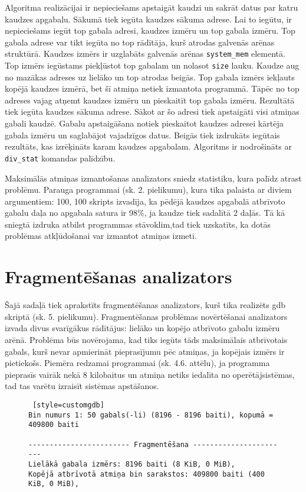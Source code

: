 Algoritma realizācijai ir nepieciešams apstaigāt kaudzi un sakrāt datus par katru kaudzes apgabalu.
Sākumā tiek iegūta kaudzes sākuma adrese.
Lai to iegūtu, ir nepieciešams iegūt top gabala adresi, kaudzes izmēru un top gabala izmēru.
Top gabala adrese var tikt iegūta no top rādītāja, kurš atrodas galvenās arēnas struktūrā.
Kaudzes izmērs ir uzglabāts galvenās arēnas \texttt{system\_mem} elementā.
Top izmērs iegūstams piekļūstot top gabalam un nolasot \texttt{size} lauku.
Kaudze aug no mazākas adreses uz lielāko un top atrodas beigās.
Top gabala izmērs iekļauts kopējā kaudzes izmērā, bet šī atmiņa netiek izmantota programmā.
Tāpēc no top adreses vajag atņemt kaudzes izmēru un pieskaitīt top gabala izmēru.
Rezultātā tiek iegūta kaudzes sākuma adrese.
Sākot ar šo adresi tiek apstaigāti visi atmiņas gabali kaudzē.
Gabalu apstaigāšana notiek pieskaitot kaudzes adresei kārtēja gabala izmēru un saglabājot vajadzīgos datus.
Beigās tiek izdrukāts iegūtais rezultāts, kas izrēķināts karam kaudzes apgabalam.
Algoritms ir nodrošināts ar \texttt{div\_stat} komandas palīdzību.

Maksimālās atmiņas izmantošanas analizators sniedz statistiku, kura palīdz atrast problēmu.
Parauga programmai (sk. 2. pielikumu), kura tika palaista ar diviem argumentiem: 100, 100 skripts izvadīja, ka pēdējā kaudzes apgabalā atbrīvoto gabalu daļa no apgabala satura ir 98\%, ja kaudze tiek sadalītā 2 daļās.
Tā kā sniegtā izdruka atbilst programmas stāvoklim,tad tiek uzskatīts, ka dotās problēmas atkļūdošanai var izmantot atmiņas izmeti.

\section{Fragmentēšanas analizators}
Šajā sadaļā tiek aprakstīts fragmentēšanas analizators, kurš tika realizēts gdb skriptā (sk. 5. pielikumu).
Fragmentēšanas problēmas novērtēšanai analizators izvada divus svarīgākus rādītājus: lielāko un kopējo atbrīvoto gabalu izmēru arēnā.
Problēma būs novērojama, kad tiks iegūts tāds maksimālais atbrīvotais gabals, kurš nevar apmierināt pieprasījumu pēc atmiņas, ja kopējais izmērs ir pietiekošs.
Piemēra redzamai programmai (sk. 4.6. attēlu), ja programma pieprasīs vairāk nekā 8 kilobaitus un atmiņa netiks iedalīta no operētājsistēmas, tad tas varētu izraisīt sistēmas apstāšanos.
\begin{figure}[h]
\begin{lstlisting} [style=customgdb]
Bin numurs 1: 50 gabals(-li) (8196 - 8196 baiti), kopumā = 409800 baiti

------------------------ Fragmentēšana -----------------------
Lielākā gabala izmērs: 8196 baiti (8 KiB, 0 MiB),
Kopējā atbrīvotā atmiņa bin sarakstos: 409800 baiti (400 KiB, 0 MiB),
\end{lstlisting}
\caption{\textbf{\fontsize{11}{12}\selectfont {Fragmentēšanas rādītāji}}}
\end{figure}

